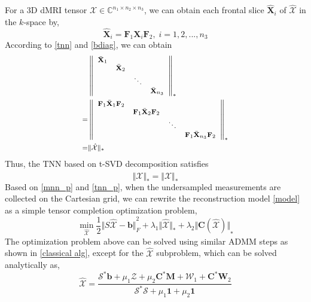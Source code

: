 \documentclass{article}
\begin{document}
For a 3D dMRI tensor $\mathcal{X} \in \mathbb{C}^{n_1 \times n_2 \times n_3}$, we can obtain each frontal slice $\hat{\mathbf{X}}_i$ of $\hat{\mathcal{X}}$ in the $k$-space by,
\begin{equation}
  \hat{\mathbf{X}}_i = \mathbf F_1 \mathbf{X}_i \mathbf F_2,\;i=1,2,...,n_3
\end{equation}
According to \eqref{tnn} and \eqref{bdiag}, we can obtain
\begin{equation}
  \footnotesize
\begin{aligned}
&\left\Vert 
  \begin{array}{llll}
  \bar{\mathbf X}_1 & & & \\
  & \bar{\mathbf X}_2 & & \\
  & & \ddots & \\
  & & & \bar{\mathbf X}_{n_3}
  \end{array}\right\Vert_*   \\
= &\left\Vert 
  \begin{array}{llll}
    \mathbf F_1 \bar{\mathbf X}_1 \mathbf F_2 & & & \\
    &\mathbf F_1 \bar{\mathbf X}_2 \mathbf F_2& & \\
    & & \ddots & \\
    & & & \mathbf F_1 \bar{\mathbf X}_{n_3} \mathbf F_2
  \end{array}\right\Vert_* \\
=&\Vert \hat{\mathcal{X}} \Vert_*
\end{aligned}
\end{equation}
Thus, the TNN based on t-SVD decomposition satisfies
\begin{equation}
  \label{tnn_p}
  \Vert \mathcal{X} \Vert_* = \Vert \hat{\mathcal{X}} \Vert_*
\end{equation}
Based on \eqref{mnn_p} and \eqref{tnn_p}, when the undersampled measurements are collected on the Cartesian grid, we can rewrite the reconstruction model \eqref{model} as a simple tensor completion optimization problem,
\begin{equation}
  \label{model2}
  \min_{\hat{\mathcal{X}}} \frac12 {\Vert S \hat{\mathcal{X}}-\mathbf b \Vert}_F^2+\lambda_1{\Vert \hat{\mathcal{X}} \Vert}_*+\lambda_2{\Vert \mathbf C(\hat{\mathcal{X}}) \Vert}_*
\end{equation}
The optimization problem above can be solved using similar ADMM steps as shown in \ref{classical alg}, except for the $\hat{\mathcal{X}}$ subproblem, which can be solved analytically as,
{\small
\begin{equation}
  \label{x2_}
  \hat{\mathcal{X}} = \frac{\mathcal{S}^*\mathbf b+\mu_1\mathcal{Z}+\mu_2 \mathbf C^* \mathbf M+\mathcal{W}_1+\mathbf C^* \mathbf{W}_2}{\mathcal{S}^* \mathcal{S}+\mu_1\mathbf 1+\mu_2\mathbf 1}
\end{equation}}
\end{document}

